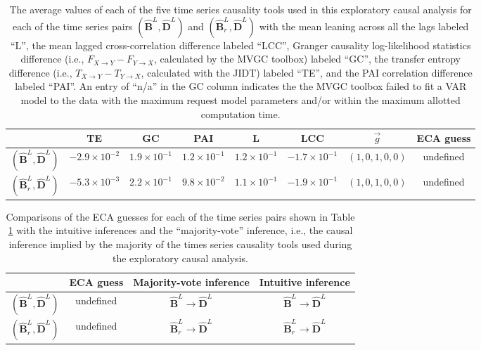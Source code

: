 \documentclass{article}[10pt]
\begin{document}
\begin{table}
\begin{center}
\begin{tabular}{lccccccc}
  & TE & GC & PAI & L & LCC & $\vec{g}$ & ECA guess\\
\midrule
$(\hat{\mathbf{B}}^L,\hat{\mathbf{D}}^L)$ & $-2.9\times 10^{-2}$ & $1.9\times 10^{-1}$ & $1.2\times 10^{-1}$ & $1.2\times 10^{-1}$ & $-1.7\times 10^{-1}$ & $(1,0,1,0,0)$ & undefined\\
$(\hat{\mathbf{B}}^L_r,\hat{\mathbf{D}}^L)$ & $-5.3\times 10^{-3}$ & $2.2\times 10^{-1}$ & $9.8\times 10^{-2}$ & $1.1\times 10^{-1}$ & $-1.9\times 10^{-1}$ & $(1,0,1,0,0)$ & undefined
\end{tabular}
\caption{The average values of each of the five time series causality tools used in this exploratory causal analysis for each of the time series pairs $(\hat{\mathbf{B}}^L,\hat{\mathbf{D}}^L)$ and $(\hat{\mathbf{B}}^L_r,\hat{\mathbf{D}}^L)$ with the mean leaning across all the lags labeled ``L'', the mean lagged cross-correlation difference labeled ``LCC'', Granger causality log-likelihood statistics difference (i.e., $F_{X\rightarrow Y}-F_{Y\rightarrow X}$, calculated by the MVGC toolbox) labeled ``GC'', the transfer entropy difference (i.e., $T_{X\rightarrow Y}-T_{Y\rightarrow X}$, calculated with the JIDT) labeled ``TE'', and the PAI correlation difference labeled ``PAI''.  An entry of ``n/a'' in the GC column indicates the the MVGC toolbox failed to fit a VAR model to the data with the maximum request model parameters and/or within the maximum allotted computation time.}
\label{tab:SolExSamp}
\end{center}
\end{table}
\begin{table}
\begin{center}
\begin{tabular}{lccc}
  & ECA guess & Majority-vote inference & Intuitive inference\\
\midrule
$(\hat{\mathbf{B}}^L,\hat{\mathbf{D}}^L)$ & undefined & $\hat{\mathbf{B}}^L\rightarrow\hat{\mathbf{D}}^L$ & $\hat{\mathbf{B}}^L\rightarrow\hat{\mathbf{D}}^L$\\
$(\hat{\mathbf{B}}^L_r,\hat{\mathbf{D}}^L)$ & undefined & $\hat{\mathbf{B}}^L_r\rightarrow\hat{\mathbf{D}}^L$ & $\hat{\mathbf{B}}^L_r\rightarrow\hat{\mathbf{D}}^L$
\end{tabular}
\caption{Comparisons of the ECA guesses for each of the time series pairs shown in Table \ref{tab:SolExSamp} with the intuitive inferences and the ``majority-vote'' inference, i.e., the causal inference implied by the majority of the times series causality tools used during the exploratory causal analysis.}
\label{tab:SolExSampECAguess}
\end{center}
\end{table}
\end{document}
